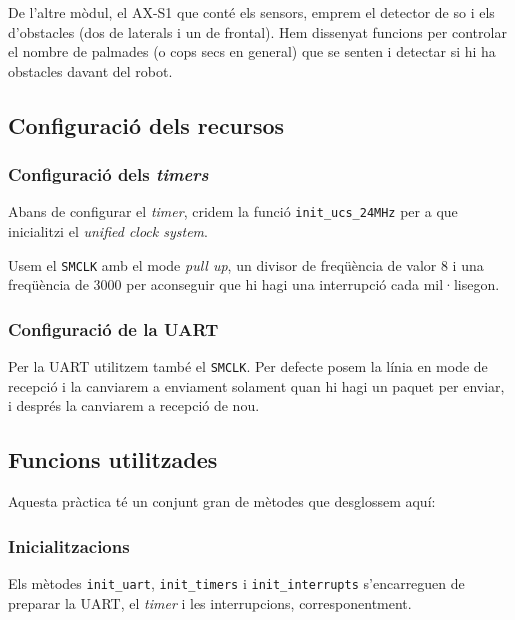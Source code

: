 \documentclass{../pdae} %
\begin{document}
De l'altre mòdul, el AX-S1 que conté els sensors, emprem el detector de so
i els d'obstacles (dos de laterals i un de frontal). Hem dissenyat funcions
per controlar el nombre de palmades (o cops secs en general) que se senten
i detectar si hi ha obstacles davant del robot.



\subsection{Configuració dels recursos}

\subsubsection{Configuració dels \textit{timers}}

Abans de configurar el \textit{timer}, cridem la funció
\texttt{init\_ucs\_24MHz} per a que inicialitzi el
\textit{unified clock system}.

Usem el \texttt{SMCLK} amb el mode \textit{pull up}, un divisor de freqüència
de valor 8 i una freqüència de 3000 per aconseguir que hi hagi una
interrupció cada mil·lisegon.

\subsubsection{Configuració de la UART}

Per la UART utilitzem també el \texttt{SMCLK}. Per defecte posem la línia en
mode de recepció i la canviarem a enviament solament quan hi hagi un paquet per
enviar, i després la canviarem a recepció de nou.



\subsection{Funcions utilitzades}

Aquesta pràctica té un conjunt gran de mètodes que desglossem aquí:

\subsubsection{Inicialitzacions}

Els mètodes \texttt{init\_uart}, \texttt{init\_timers} i
\texttt{init\_interrupts} s'encarreguen de preparar la UART, el \textit{timer}
i les interrupcions, corresponentment.
\end{document}
